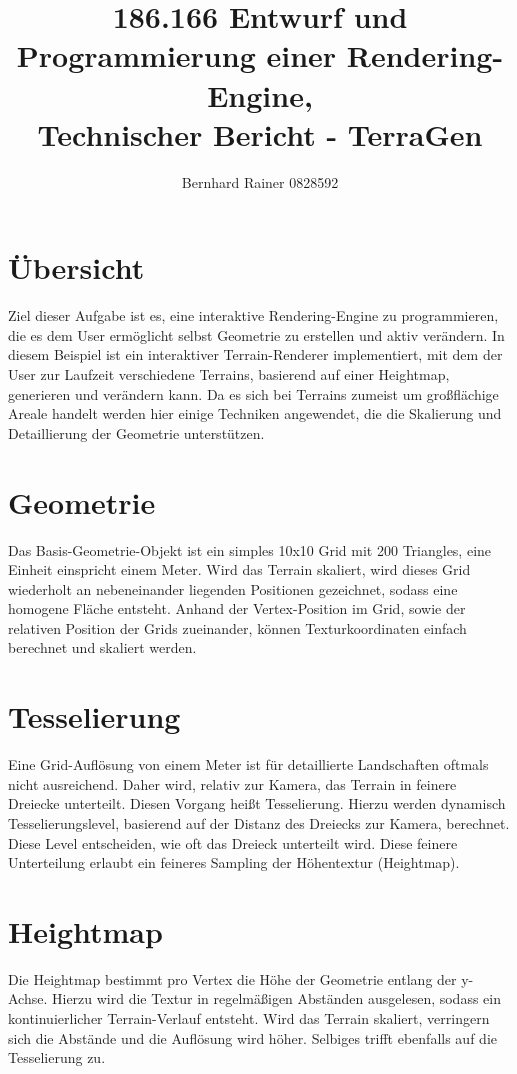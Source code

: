 \documentclass[a4paper,10pt]{article}
\begin{document}
\author{Bernhard Rainer 0828592 \\
	}

\title{186.166 Entwurf und Programmierung einer Rendering-Engine,\\
	Technischer Bericht - TerraGen}

\maketitle

\section*{Übersicht}
Ziel dieser Aufgabe ist es, eine interaktive Rendering-Engine zu programmieren, die es dem User ermöglicht selbst Geometrie zu erstellen und aktiv verändern. In diesem Beispiel ist ein interaktiver Terrain-Renderer implementiert, mit dem der User zur Laufzeit verschiedene Terrains, basierend auf einer Heightmap, generieren und verändern kann. 
Da es sich bei Terrains zumeist um großflächige Areale handelt werden hier einige Techniken angewendet, die die Skalierung und Detaillierung der Geometrie unterstützen. 

\section*{Geometrie}
Das Basis-Geometrie-Objekt ist ein simples 10x10 Grid mit 200 Triangles, eine Einheit einspricht einem Meter. Wird das Terrain skaliert, wird dieses Grid wiederholt an nebeneinander liegenden Positionen gezeichnet, sodass eine homogene Fläche entsteht. Anhand der Vertex-Position im Grid, sowie der relativen Position der Grids zueinander, können Texturkoordinaten einfach berechnet und skaliert werden. 

\section*{Tesselierung}
Eine Grid-Auflösung von einem Meter ist für detaillierte Landschaften oftmals nicht ausreichend. Daher wird, relativ zur Kamera, das Terrain in feinere Dreiecke unterteilt. Diesen Vorgang heißt Tesselierung. Hierzu werden dynamisch  Tesselierungslevel, basierend auf der Distanz des Dreiecks zur Kamera, berechnet. Diese Level entscheiden, wie oft das Dreieck unterteilt wird. Diese feinere Unterteilung erlaubt ein feineres Sampling der Höhentextur (Heightmap). 

\section*{Heightmap}
Die Heightmap bestimmt pro Vertex die Höhe der Geometrie entlang der y-Achse. Hierzu wird die Textur in regelmäßigen Abständen ausgelesen, sodass ein kontinuierlicher Terrain-Verlauf entsteht. Wird das Terrain skaliert, verringern sich die Abstände und die Auflösung wird höher. Selbiges trifft ebenfalls auf die Tesselierung zu.
\end{document}
